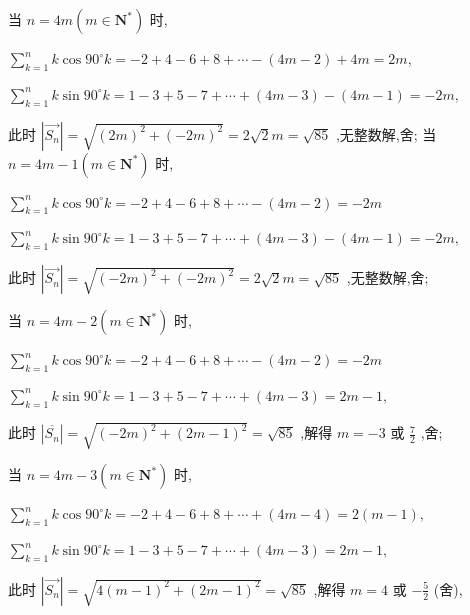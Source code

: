 \documentclass[10pt]{article}
\begin{document}
当 \(n = {4m}\left( {m \in  {\mathbf{N}}^{ * }}\right)\) 时,

\(\mathop{\sum }\limits_{{k = 1}}^{n}k\cos {90}^{ \circ  }k =  - 2 + 4 - 6 + 8 + \cdots  - \left( {{4m} - 2}\right)  + {4m} = {2m},\)

\(\mathop{\sum }\limits_{{k = 1}}^{n}k\sin {90}^{ \circ  }k = 1 - 3 + 5 - 7 + \cdots  + \left( {{4m} - 3}\right)  - \left( {{4m} - 1}\right)  =  - {2m},\)

此时 \(\left| \overrightarrow{{S}_{n}}\right|  = \sqrt{{\left( 2m\right) }^{2} + {\left( -2m\right) }^{2}} = 2\sqrt{2}m = \sqrt{85}\) ,无整数解,舍; 当 \(n = {4m} - 1\left( {m \in  {\mathbf{N}}^{ * }}\right)\) 时,

\(\mathop{\sum }\limits_{{k = 1}}^{n}k\cos {90}^{ \circ  }k =  - 2 + 4 - 6 + 8 + \cdots  - \left( {{4m} - 2}\right)  =  - {2m}\)

\(\mathop{\sum }\limits_{{k = 1}}^{n}k\sin {90}^{ \circ  }k = 1 - 3 + 5 - 7 + \cdots  + \left( {{4m} - 3}\right)  - \left( {{4m} - 1}\right)  =  - {2m},\)

此时 \(\left| \overrightarrow{{S}_{n}}\right|  = \sqrt{{\left( -2m\right) }^{2} + {\left( -2m\right) }^{2}} = 2\sqrt{2}m = \sqrt{85}\) ,无整数解,舍;

当 \(n = {4m} - 2\left( {m \in  {\mathbf{N}}^{ * }}\right)\) 时,

\(\mathop{\sum }\limits_{{k = 1}}^{n}k\cos {90}^{ \circ  }k =  - 2 + 4 - 6 + 8 + \cdots  - \left( {{4m} - 2}\right)  =  - {2m}\)

\(\mathop{\sum }\limits_{{k = 1}}^{n}k\sin {90}^{ \circ  }k = 1 - 3 + 5 - 7 + \cdots  + \left( {{4m} - 3}\right)  = {2m} - 1,\)

此时 \(\left| \overline{{S}_{n}}\right|  = \sqrt{{\left( -2m\right) }^{2} + {\left( 2m - 1\right) }^{2}} = \sqrt{85}\) ,解得 \(m =  - 3\) 或 \(\frac{7}{2}\) ,舍;

当 \(n = {4m} - 3\left( {m \in  {\mathbf{N}}^{ * }}\right)\) 时,

\(\mathop{\sum }\limits_{{k = 1}}^{n}k\cos {90}^{ \circ  }k =  - 2 + 4 - 6 + 8 + \cdots  + \left( {{4m} - 4}\right)  = 2\left( {m - 1}\right) ,\)

\(\mathop{\sum }\limits_{{k = 1}}^{n}k\sin {90}^{ \circ  }k = 1 - 3 + 5 - 7 + \cdots  + \left( {{4m} - 3}\right)  = {2m} - 1,\)

此时 \(\left| \overrightarrow{{S}_{n}}\right|  = \sqrt{4{\left( m - 1\right) }^{2} + {\left( 2m - 1\right) }^{2}} = \sqrt{85}\) ,解得 \(m = 4\) 或 \(- \frac{5}{2}\) (舍),
\end{document}
